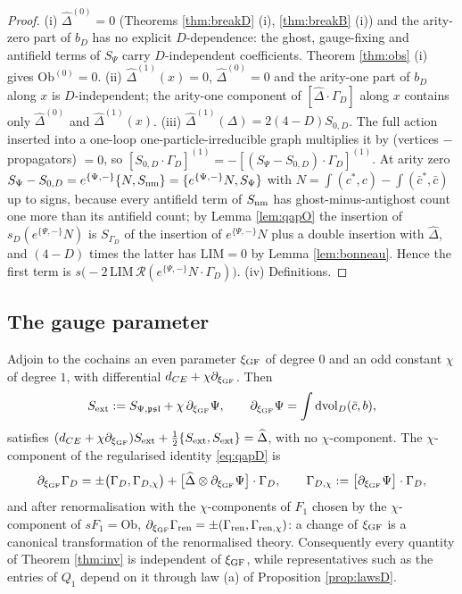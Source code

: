\begin{proof}
(i) $\widehat\Delta^{(0)}=0$ (Theorems \ref{thm:breakD} (i), \ref{thm:breakB} (i)) and the arity-zero part of $b_D$ has no explicit $D$-dependence: the ghost, gauge-fixing and antifield terms of $S_{\Psi}$ carry $D$-independent coefficients. Theorem \ref{thm:obs} (i) gives $\mathrm{Ob}^{(0)}=0$. (ii) $\widehat\Delta^{(1)}(x)=0$, $\widehat\Delta^{(0)}=0$ and the arity-one part of $b_D$ along $x$ is $D$-independent; the arity-one component of $[\widehat\Delta\cdot\Gamma_D]$ along $x$ contains only $\widehat\Delta^{(0)}$ and $\widehat\Delta^{(1)}(x)$. (iii) $\widehat\Delta^{(1)}(\Delta)=2(4-D)S_{0,D}$. The full action inserted into a one-loop one-particle-irreducible graph multiplies it by (vertices $-$ propagators) $=0$, so $[S_{0,D}\cdot\Gamma_D]^{(1)}=-[(S_\Psi-S_{0,D})\cdot\Gamma_D]^{(1)}$. At arity zero $S_\Psi-S_{0,D}=e^{\{\Psi,-\}}\{N,S_{\rm nm}\}=\{e^{\{\Psi,-\}}N,S_\Psi\}$ with $N=\int(c^*,c)-\int(\bar c^*,\bar c)$ up to signs, because every antifield term of $S_{\rm nm}$ has ghost-minus-antighost count one more than its antifield count; by Lemma \ref{lem:qapO} the insertion of $s_D(e^{\{\Psi,-\}}N)$ is $S_{\Gamma_D}$ of the insertion of $e^{\{\Psi,-\}}N$ plus a double insertion with $\widehat\Delta$, and $(4-D)$ times the latter has $\mathrm{LIM}=0$ by Lemma \ref{lem:bonneau}. Hence the first term is $s\big(-2\,\mathrm{LIM}\,\mathcal R(e^{\{\Psi,-\}}N\cdot\Gamma_D)\big)$. (iv) Definitions.
\end{proof}

\subsection{The gauge parameter}

\begin{theorem}
\label{thm:nielsen}
Adjoin to the cochains an even parameter $\xi_{\rm GF}$ of degree $0$ and an odd constant $\chi$ of degree $1$, with differential $d_{CE}+\chi\partial_{\xi_{\rm GF}}$. Then
\[
S_{\rm ext}:=S_{\Psi,\mathfrak{psl}}+\chi\,\partial_{\xi_{\rm GF}}\Psi,\qquad \partial_{\xi_{\rm GF}}\Psi=\int\mathrm{dvol}_D(\bar c,b),
\]
satisfies $(d_{CE}+\chi\partial_{\xi_{\rm GF}})S_{\rm ext}+\frac12\{S_{\rm ext},S_{\rm ext}\}=\widehat\Delta$, with no $\chi$-component. The $\chi$-component of the regularised identity \eqref{eq:qapD} is
\[
\partial_{\xi_{\rm GF}}\Gamma_D=\pm\big(\Gamma_D,\Gamma_{D,\chi}\big)+\big[\widehat\Delta\otimes\partial_{\xi_{\rm GF}}\Psi\big]\cdot\Gamma_D,\qquad \Gamma_{D,\chi}:=\big[\partial_{\xi_{\rm GF}}\Psi\big]\cdot\Gamma_D,
\]
and after renormalisation with the $\chi$-components of $F_1$ chosen by the $\chi$-component of $sF_1=\mathrm{Ob}$, $\partial_{\xi_{\rm GF}}\Gamma_{\rm ren}=\pm(\Gamma_{\rm ren},\Gamma_{{\rm ren},\chi})$: a change of $\xi_{\rm GF}$ is a canonical transformation of the renormalised theory. Consequently every quantity of Theorem \ref{thm:inv} is independent of $\xi_{\rm GF}$, while representatives such as the entries of $Q_1$ depend on it through law (a) of Proposition \ref{prop:lawsD}.
\end{theorem}

